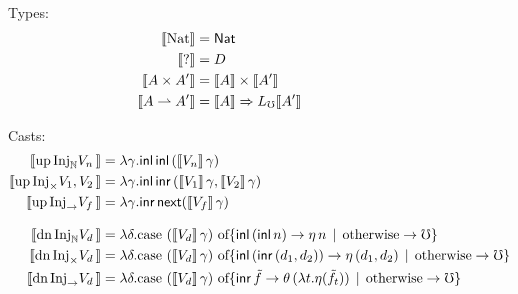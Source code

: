 \begin{figure*}
  \noindent Types:
  \begin{align*}
    \sem{\nat} &= \Nat \\
    \sem{\dyn} &= D \\
    \sem{A \times A'} &= \sem{A} \times \sem{A'} \\ 
    \sem{A \ra A'} &= \sem{A} \To \li \sem{A'} \\
  \end{align*}


  \noindent Casts:
  \begin{align*}
    \sem{\upc{\inat{V_n}}} &= \lambda \gamma . \inl\, \inl\, (\sem{V_n}\, \gamma) \\
    \sem{\upc{\itimes{V_1, V_2}}} &= \lambda \gamma . \inl\, \inr\, (\sem{V_1}\, \gamma, \sem{V_2}\, \gamma) \\
    \sem{\upc{\iarr{V_f}}} &= \lambda \gamma . \inr\, \nxt (\sem{V_f}\, \gamma) \\[2ex]
    \sem{\dnc{\inat V_d}} &=
      \lambda \delta . \text{case $(\sem{V_d}\, \gamma)$ of}
      \{ \inl\, (\inl\, n) \to \eta\, n
         \alt \text{otherwise} \to \mho \} \\
    \sem{\dnc{\itimes V_d}} &=
      \lambda \delta . \text{case $(\sem{V_d}\, \gamma)$ of}
      \{ \inl\, (\inr\, (d_1, d_2)) \to \eta\, (d_1, d_2)
         \alt \text{otherwise} \to \mho \} \\
    \sem{\dnc{\iarr V_d}} &=
      \lambda \delta . \text{case $(\sem{V_d}\, \gamma)$ of}
      \{ \inr\, \tilde{f} \to \theta\, (\lambda t. \eta (\tilde{f}_t))
         \alt \text{otherwise} \to \mho \} \\
  \end{align*}


\end{figure*}
